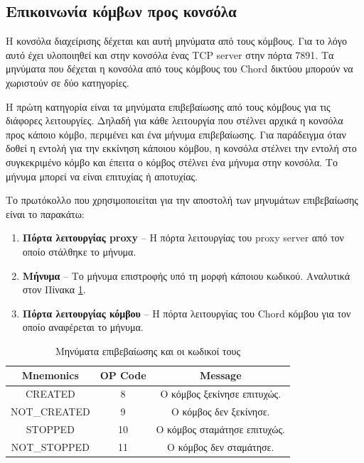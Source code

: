 \documentclass[a4paper]{article}
\begin{document}
\subsection{Επικοινωνία κόμβων προς κονσόλα}
Η κονσόλα διαχείρισης δέχεται και αυτή μηνύματα από τους κόμβους. Για το λόγο
αυτό έχει υλοποιηθεί και στην κονσόλα ένας TCP server στην πόρτα 7891. Τα
μηνύματα που δέχεται η κονσόλα από τους κόμβους του Chord δικτύου μπορούν να
χωριστούν σε δύο κατηγορίες.

Η πρώτη κατηγορία είναι τα μηνύματα επιβεβαίωσης από τους κόμβους για τις
διάφορες λειτουργίες. Δηλαδή για κάθε λειτουργία που στέλνει αρχικά η κονσόλα
προς κάποιο κόμβο, περιμένει και ένα μήνυμα επιβεβαίωσης. Για παράδειγμα όταν
δοθεί η εντολή για την εκκίνηση κάποιου κόμβου, η κονσόλα στέλνει την εντολή στο
συγκεκριμένο κόμβο και έπειτα ο κόμβος στέλνει ένα μήνυμα στην κονσόλα. Το
μήνυμα μπορεί να είναι επιτυχίας ή αποτυχίας.

Το πρωτόκολλο που χρησιμοποιείται για την αποστολή των μηνυμάτων επιβεβαίωσης
είναι το παρακάτω:
\begin{enumerate}
\item \textbf{Πόρτα λειτουργίας proxy} -- Η πόρτα λειτουργίας του proxy server
από τον οποίο στάλθηκε το μήνυμα.
\item \textbf{Μήνυμα} -- Το μήνυμα επιστροφής υπό τη μορφή κάποιου κωδικού.
Αναλυτικά στον Πίνακα \ref{tab:messages}.
\item \textbf{Πόρτα λειτουργίας κόμβου} -- Η πόρτα λειτουργίας του Chord κόμβου
για τον οποίο αναφέρεται το μήνυμα.
\end{enumerate}

\begin{table}[h!b!p!]
\begin{center}
\begin{tabular}{| c | c | c |}
\hline
\textbf{Μnemonics} & \textbf{OP Code} & \textbf{Message}\\
\hline
\hline
CREATED & 8 & Ο κόμβος ξεκίνησε επιτυχώς.\\
\hline
NOT\_CREATED & 9 & Ο κόμβος δεν ξεκίνησε.\\
\hline
STOPPED & 10 & Ο κόμβος σταμάτησε επιτυχώς.\\
\hline
NOT\_STOPPED & 11 & Ο κόμβος δεν σταμάτησε.\\
\hline
\end{tabular}
\end{center}
\caption{Μηνύματα επιβεβαίωσης και οι κωδικοί τους}
\label{tab:messages}
\end{table}
\end{document}
